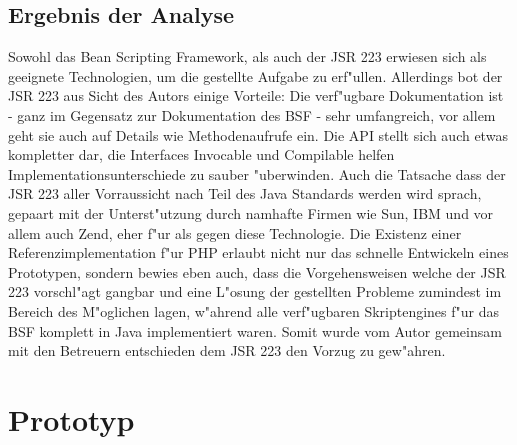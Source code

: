 \subsection{Ergebnis der Analyse}
\label{sec:chap1:ana:fazit}

Sowohl das Bean Scripting Framework, als auch der JSR 223 erwiesen sich als geeignete Technologien, um die gestellte Aufgabe zu 
erf"ullen. Allerdings bot der JSR 223 aus Sicht des Autors einige Vorteile: 
Die verf"ugbare Dokumentation ist - ganz im Gegensatz zur Dokumentation des BSF - sehr umfangreich, vor allem geht sie auch
auf Details wie Methodenaufrufe ein. Die API stellt sich auch etwas kompletter dar, die Interfaces Invocable und Compilable 
helfen Implementationsunterschiede zu sauber "uberwinden. Auch die Tatsache dass der JSR 223 aller Vorraussicht nach Teil
des Java Standards werden wird sprach, gepaart mit der Unterst"utzung durch namhafte Firmen wie Sun, IBM und vor allem auch 
Zend, eher f"ur als gegen diese Technologie. Die Existenz einer Referenzimplementation f"ur PHP erlaubt nicht nur das
schnelle Entwickeln eines Prototypen, sondern bewies eben auch, dass die Vorgehensweisen welche der JSR 223 vorschl"agt 
gangbar und eine L"osung der gestellten Probleme zumindest im Bereich des M"oglichen lagen, w"ahrend alle verf"ugbaren
Skriptengines f"ur das BSF komplett in Java implementiert waren.
Somit wurde vom Autor gemeinsam mit den Betreuern entschieden dem JSR 223 den Vorzug zu gew"ahren.

\section{Prototyp}
\label{sec:chap1:prototype}

